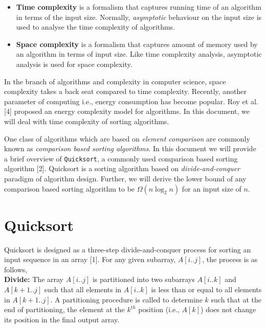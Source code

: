 \documentclass[a4paper, 10pt, twocolumn]{article}
\begin{document}
\begin{itemize}
    \item\textbf{Time complexity} is a formalism that captures running time of an algorithm in terms of the input size. Normally, \textit{asymptotic} behaviour on the input size is used to analyse the time complexity of algorithms.
    
    \item\textbf{Space complexity} is a formalism that captures amount of memory used by an algorithm in terms of input size. Like time complexity analysis, asymptotic analysis is used for space complexity.
\end{itemize}
In the branch of algorithms and complexity in computer science, space complexity takes a back seat compared to time complexity. Recently, another parameter of computing i.e., energy consumption has become popular. Roy et al. [4] proposed an energy complexity model for algorithms. In this document, we will deal with time complexity of sorting algorithms.\par
One class of algorithms which are based on \textit{element comparison} are commonly known as \textit{comparison based sorting algorithms}. In this document we will provide a brief overview of \texttt{Quicksort}, a commonly used comparison based sorting algorithm [2]. Quicksort is a sorting algorithm based on \textit{divide-and-conquer} paradigm of algorithm design. Further, we will derive the lower bound of any comparison based sorting algorithm to be $\Omega(n\log_2{n})$ for an input size of $n$.

\section{Quicksort}

Quicksort is designed as a three-step divide-and-conquer process for sorting an input sequence in an array [1]. For any given subarray, $A[i..j]$, the process is as follows,\\
\textbf{Divide:} The array $A[i..j]$ is partitioned into two subarrays $A[i..k]$ and $A[k+1..j]$ such that all elements in $A[i..k]$ is less than or equal to all elements in $A[k+1..j]$. A partitioning procedure is called to determine $k$ such that at the end of partitioning, the element at the $k^{th}$ position (i.e., $A[k]$) does not change its position in the final output array.
\end{document}
